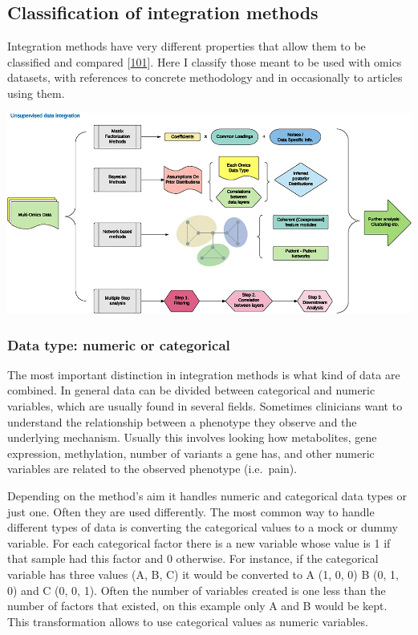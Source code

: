 \documentclass[
  12pt,
  a4paper,
  twoside,
  openright]{book}
\let\origfigure\figure
\let\endorigfigure\endfigure
\renewenvironment{figure}[1][2] {
    \expandafter\origfigure\expandafter[!ht]
} {
    \endorigfigure
}
\begin{document}
\hypertarget{classification-of-integration-methods}{%
\subsection{Classification of integration methods}\label{classification-of-integration-methods}}

Integration methods have very different properties that allow them to be classified and compared {[}\protect\hyperlink{ref-huang2017}{101}{]}.
Here I classify those meant to be used with omics datasets, with references to concrete methodology and in occasionally to articles using them.

\begin{figure}
\includegraphics[width=1\linewidth]{images/figure1_huang2017} \caption[Unsupervised data integration methodology.]{Unsupervised data integration methodology. Figure 1 from Huang 2017.}\label{fig:classification}
\end{figure}

\hypertarget{data-type-numeric-or-categorical}{%
\subsubsection{Data type: numeric or categorical}\label{data-type-numeric-or-categorical}}

The most important distinction in integration methods is what kind of data are combined.
In general data can be divided between categorical and numeric variables, which are usually found in several fields.
Sometimes clinicians want to understand the relationship between a phenotype they observe and the underlying mechanism.
Usually this involves looking how metabolites, gene expression, methylation, number of variants a gene has, and other numeric variables are related to the observed phenotype (i.e.~pain).

Depending on the method's aim it handles numeric and categorical data types or just one.
Often they are used differently.
The most common way to handle different types of data is converting the categorical values to a mock or dummy variable.
For each categorical factor there is a new variable whose value is 1 if that sample had this factor and 0 otherwise.
For instance, if the categorical variable has three values (A, B, C) it would be converted to A (1, 0, 0) B (0, 1, 0) and C (0, 0, 1).
Often the number of variables created is one less than the number of factors that existed, on this example only A and B would be kept.
This transformation allows to use categorical values as numeric variables.
\end{document}
